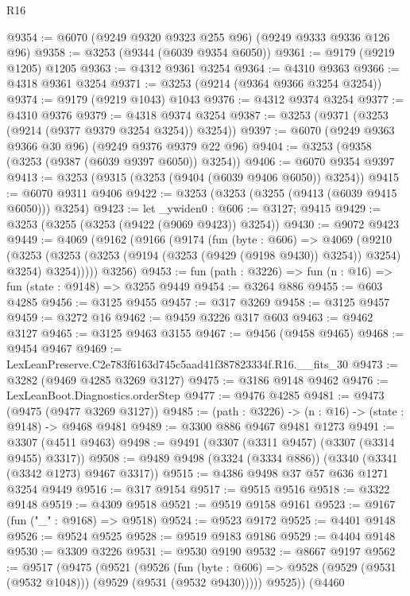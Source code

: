 \begin{lexlean}{R16}
\begin{coremodule}
@9354 := @6070 (@9249 @9320 @9323 @255 @96) (@9249 @9333 @9336 @126 @96)
@9358 := @3253 (@9344 (@6039 @9354 @6050))
@9361 := @9179 (@9219 @1205) @1205
@9363 := @4312 @9361 @3254
@9364 := @4310 @9363
@9366 := @4318 @9361 @3254
@9371 := @3253 (@9214 (@9364 @9366 @3254 @3254))
@9374 := @9179 (@9219 @1043) @1043
@9376 := @4312 @9374 @3254
@9377 := @4310 @9376
@9379 := @4318 @9374 @3254
@9387 := @3253 (@9371 (@3253 (@9214 (@9377 @9379 @3254 @3254)) @3254))
@9397 := @6070 (@9249 @9363 @9366 @30 @96) (@9249 @9376 @9379 @22 @96)
@9404 := @3253 (@9358 (@3253 (@9387 (@6039 @9397 @6050)) @3254))
@9406 := @6070 @9354 @9397
@9413 := @3253 (@9315 (@3253 (@9404 (@6039 @9406 @6050)) @3254))
@9415 := @6070 @9311 @9406
@9422 := @3253 (@3253 (@3255 (@9413 (@6039 @9415 @6050))) @3254)
@9423 := let _ywiden0 : @606 := @3127; @9415
@9429 := @3253 (@3255 (@3253 (@9422 (@9069 @9423)) @3254))
@9430 := @9072 @9423
@9449 := @4069
    (@9162
      (@9166
        (@9174
          (fun (byte : @606) =>
          @4069
            (@9210
              (@3253
                (@3253 (@3253 (@9194 (@3253 (@9429 (@9198 @9430)) @3254)) @3254) @3254)
                @3254)))))
      @3256)
@9453 := fun (path : @3226) => fun (n : @16) => fun (state : @9148) => @3255 @9449
@9454 := @3264 @886
@9455 := @603 @4285
@9456 := @3125 @9455
@9457 := @317 @3269
@9458 := @3125 @9457
@9459 := @3272 @16
@9462 := @9459 @3226 @317 @603
@9463 := @9462 @3127
@9465 := @3125 @9463 @3155
@9467 := @9456 (@9458 @9465)
@9468 := @9454 @9467
@9469 := LexLeanPreserve.C2e783f6163d745c5aad41f387823334f.R16.__fits_30
@9473 := @3282 (@9469 @4285 @3269 @3127)
@9475 := @3186 @9148 @9462
@9476 := LexLeanBoot.Diagnostics.orderStep
@9477 := @9476 @4285
@9481 := @9473 (@9475 (@9477 @3269 @3127))
@9485 := (path : @3226) -> (n : @16) -> (state : @9148) -> @9468 @9481
@9489 := @3300 @886 @9467 @9481 @1273
@9491 := @3307 (@4511 @9463)
@9498 := @9491 (@3307 (@3311 @9457) (@3307 (@3314 @9455) @3317))
@9508 := @9489 @9498 (@3324 (@3334 @886)) (@3340 (@3341 (@3342 @1273) @9467 @3317))
@9515 := @4386 @9498 @37 @57 @636 @1271 @3254 @9449
@9516 := @317 @9154
@9517 := @9515 @9516
@9518 := @3322 @9148
@9519 := @4309 @9518
@9521 := @9519 @9158 @9161
@9523 := @9167 (fun ("_" : @9168) => @9518)
@9524 := @9523 @9172
@9525 := @4401 @9148
@9526 := @9524 @9525
@9528 := @9519 @9183 @9186
@9529 := @4404 @9148
@9530 := @3309 @3226
@9531 := @9530 @9190
@9532 := @8667 @9197
@9562 := @9517
    (@9475
      (@9521
        (@9526
          (fun (byte : @606) => @9528 (@9529 (@9531 (@9532 @1048))) (@9529 (@9531 (@9532 @9430)))))
        @9525))
    (@4460

\end{coremodule}
\end{lexlean}
